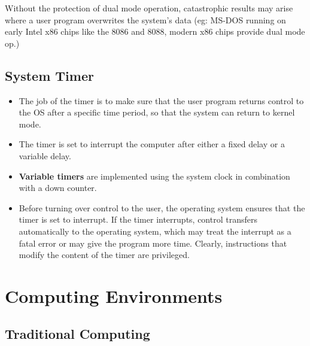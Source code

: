 \documentclass{article}
\theoremstyle{plain}
\theoremstyle{definition}
\begin{document}
Without the protection of dual mode operation, catastrophic results may arise where a user program overwrites the system's data (eg: MS-DOS running on early Intel x86 chips like the 8086 and 8088, modern x86 chips provide dual mode op.)

\subsection{System Timer}
\begin{itemize}
    \item The job of the timer is to make sure that the user program returns control to the OS after a specific time period, so that the system can return to kernel mode. 
    
    \item The timer is set to interrupt the computer after either a fixed delay or a variable delay. 
    
    \item \textbf{Variable timers} are implemented using the system clock in combination with a down counter. 
    
    \item Before turning over control to the user, the operating system ensures that the timer is set to interrupt. If the timer interrupts, control transfers automatically to the operating system, which may treat the interrupt as a fatal error or may give the program more time. Clearly, instructions that modify the content of the timer are privileged.
\end{itemize}

\section{Computing Environments}

\subsection{Traditional Computing}
\end{document}
